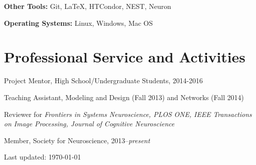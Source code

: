 \documentclass[10pt,letterpaper]{article}
\def\footerlink{} %
\renewenvironment{itemize}{
  \begin{list}{}{
    \setlength{\leftmargin}{1.5em}
    \setlength{\itemsep}{0.25em}
    \setlength{\parskip}{0pt}
    \setlength{\parsep}{0.25em}
  }
}{
  \end{list}
}
\begin{document}
\hspace{1.5em}\textbf{Other Tools:} Git, \LaTeX, HTCondor, NEST, Neuron

\hspace{1.5em}\textbf{Operating Systems:} Linux, Windows, Mac OS

\vspace{-0.1in}

\section*{Professional Service and Activities}
\vspace{-0.05in}
\begin{itemize}
\setlength\itemsep{1pt}
\item Project Mentor, High School/Undergraduate Students, 2014-2016
\item Teaching Assistant, Modeling and Design (Fall 2013) and Networks (Fall 2014)
\item Reviewer for \textit{Frontiers in Systems Neuroscience, PLOS ONE, IEEE Transactions on Image Processing, Journal of Cognitive Neuroscience}

\item Member, Society for Neuroscience, 2013--\textit{present}
\end{itemize}

\bigskip

\begin{center}
  \begin{footnotesize}
    Last updated: \today \\
    \href{\footerlink}{\texttt{\footerlink}}
  \end{footnotesize}
\end{center}
\end{document}
